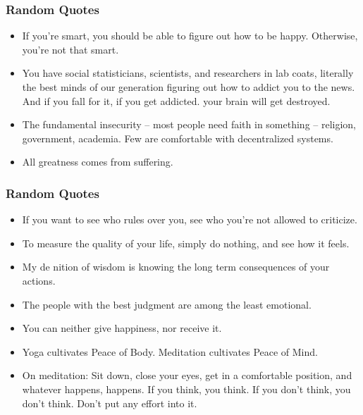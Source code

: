 \begin{frame}[fragile]\frametitle{ Random Quotes}

\begin{itemize}
\item If you’re smart, you should be able to figure out how to be happy.
Otherwise, you’re not that smart.

\item You have social statisticians, scientists, and researchers in lab coats,
literally the best minds of our generation  figuring out how to addict
you to the news. And if you fall for it, if you get addicted. your brain
will get destroyed. 

\item The fundamental insecurity – most people need faith in something –
religion, government, academia. Few are comfortable with
decentralized systems.

\item All greatness comes from suffering.

\end{itemize}

\end{frame}


\begin{frame}[fragile]\frametitle{ Random Quotes}

\begin{itemize}
\item If you want to see who rules over you, see who you’re not allowed to
criticize.
\item To measure the quality of your life, simply do nothing, and see how it
feels.
\item My de nition of wisdom is knowing the long term consequences of
your actions.

\item The people with the best judgment are among the least emotional.

\item You can neither give happiness, nor receive it.

\item Yoga cultivates Peace of Body. Meditation cultivates Peace of Mind.

\item On meditation: Sit down, close your eyes, get in a comfortable
position, and whatever happens, happens. If you think, you think. If
you don’t think, you don’t think. Don’t put any effort into it.
\end{itemize}

\end{frame}

